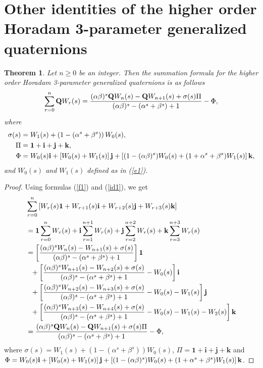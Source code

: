 \documentclass{kms-c}
\theoremstyle{plain}
\newtheorem{theorem}{Theorem}[section]
\theoremstyle{definition}
\theoremstyle{remark}
\begin{document}
\section{Other identities of the higher order Horadam 3-parameter generalized quaternions}

\begin{theorem}\label{t7}
Let $n\geq 0$ be an integer. Then the summation formula for the higher order Horadam 3-parameter generalized quaternions is as follows
\[
\sum_{r=0}^{n}\textnormal{\textbf{Q}}W_{r}(s)=\frac{(\alpha\beta)^{s}\textnormal{\textbf{Q}}W_{n}(s)-\textnormal{\textbf{Q}}W_{n+1}(s)+\sigma(s)\Pi}{(\alpha\beta)^{s}-(\alpha^{s}+\beta^{s})+1}-\Phi,
\]
where 
\begin{align*}
\sigma(s)&=W_{1}(s)+\left(1-(\alpha^{s}+\beta^{s})\right)W_{0}(s),\\
\Pi&=\textnormal{\textbf{1}}+\textnormal{\textbf{i}}+\textnormal{\textbf{j}}+\textnormal{\textbf{k}},\\
\Phi&=W_{0}(s)\textnormal{\textbf{i}}+\left[W_{0}(s)+W_{1}(s)\right]\textnormal{\textbf{j}}+\left[(1-(\alpha\beta)^{s})W_{0}(s)+(1+\alpha^{s}+\beta^{s})W_{1}(s)\right]\textnormal{\textbf{k}},
\end{align*}
and $W_{0}(s)$ and $W_{1}(s)$ defined as in (\ref{e1}).
\end{theorem}
\begin{proof}
Using formulas (\ref{f1}) and (\ref{id1}), we get
\begin{align*}
&\sum_{r=0}^{n}\left[W_{r}(s)\textbf{1}+W_{r+1}(s)\textbf{i}+W_{r+2}(s)\textbf{j}+W_{r+3}(s)\textbf{k}\right]\\
&=\textbf{1}\sum_{r=0}^{n}W_{r}(s)+\textbf{i}\sum_{r=1}^{n+1}W_{r}(s)+\textbf{j}\sum_{r=2}^{n+2}W_{r}(s)+\textbf{k}\sum_{r=3}^{n+3}W_{r}(s)\\
&=\left[\frac{(\alpha\beta)^{s}W_{n}(s)-W_{n+1}(s)+\sigma(s)}{(\alpha\beta)^{s}-(\alpha^{s}+\beta^{s})+1}\right]\textbf{1}\\
&\ \ + \left[\frac{(\alpha\beta)^{s}W_{n+1}(s)-W_{n+2}(s)+\sigma(s)}{(\alpha\beta)^{s}-(\alpha^{s}+\beta^{s})+1}-W_{0}(s)\right]\textbf{i}\\
&\ \ + \left[\frac{(\alpha\beta)^{s}W_{n+2}(s)-W_{n+3}(s)+\sigma(s)}{(\alpha\beta)^{s}-(\alpha^{s}+\beta^{s})+1}-W_{0}(s)-W_{1}(s)\right]\textbf{j}\\
&\ \ + \left[\frac{(\alpha\beta)^{s}W_{n+3}(s)-W_{n+4}(s)+\sigma(s)}{(\alpha\beta)^{s}-(\alpha^{s}+\beta^{s})+1}-W_{0}(s)-W_{1}(s)-W_{2}(s)\right]\textbf{k}\\
&=\frac{(\alpha\beta)^{s}\textnormal{\textbf{Q}}W_{n}(s)-\textnormal{\textbf{Q}}W_{n+1}(s)+\sigma(s)\Pi}{(\alpha\beta)^{s}-(\alpha^{s}+\beta^{s})+1}-\Phi,
\end{align*}
where $\sigma(s)=W_{1}(s)+\left(1-(\alpha^{s}+\beta^{s})\right)W_{0}(s)$, $\Pi=\textbf{1}+\textbf{i}+\textbf{j}+\textbf{k}$ and $\Phi=W_{0}(s)\textnormal{\textbf{i}}+\left[W_{0}(s)+W_{1}(s)\right]\textnormal{\textbf{j}}+\left[(1-(\alpha\beta)^{s})W_{0}(s)+(1+\alpha^{s}+\beta^{s})W_{1}(s)\right]\textnormal{\textbf{k}}$.
\end{proof}
\end{document}
